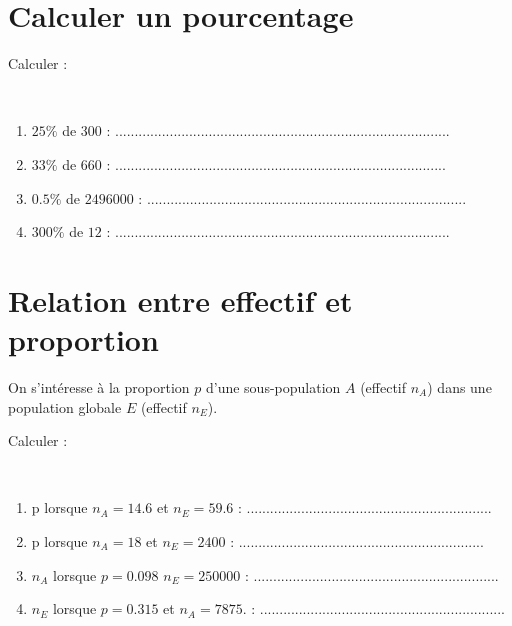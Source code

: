 	\section{Calculer un pourcentage}
	Calculer :
	\begin{questions}
		
	
		\question[2] \ 
		
		\begin{enumerate}[label=\alph*)]
			
			\item $25 \%$ de $\num{300}$ :  ......................................................................................
			\item $33 \%$ de $\num{660}$ : .....................................................................................
			\item $\num{0.5} \%$ de $\num{2496000}$ : ..................................................................................
			\item $300 \%$ de $\num{12}$ : ......................................................................................
		\end{enumerate}
	\end{questions}
	
	
\section{Relation entre effectif et proportion}

On s'intéresse à la proportion $p$ d'une sous-population $A$ (effectif $n_A$) dans une population globale $E$ (effectif $n_E$).

Calculer :
\begin{questions}

	
	\question[4] \
	
	\begin{enumerate}[label=\alph*)]
		
		\item p lorsque $n_A=\num{14.6}$ et $n_E= \num{59.6} $ :  ...............................................................
		\item p lorsque $n_A=\num{18}$ et $n_E= \num{2400}$ : ...............................................................
		\item $n_A$ lorsque $p=\num{0.098}$ $n_E= \num{250000}$ : ...............................................................
		\item $n_E$ lorsque $p=\num{0.315} $ et $n_A=\num{7875}.$ : ...............................................................
	\end{enumerate}
\end{questions}


